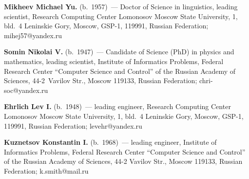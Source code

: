 \noindent
\textbf{Mikheev Michael Yu.} (b.\ 1957)~--- Doctor of Science in linguistics, leading scientist, 
Research Computing Center Lomonosov Moscow State University, 1, bld.~4 Leninskie Gory, 
Moscow, GSP-1, 119991, Russian Federation;  \mbox{mihej57@yandex.ru}

\vspace*{6pt}

\noindent
\textbf{Somin Nikolai V.} (b.\ 1947)~--- Candidate of Science (PhD) in physics and 
mathematics, leading scientist, Institute of Informatics Problems, Federal Research Center 
``Computer Science and Control'' of the Russian Academy of Sciences, 44-2~Vavilov Str., 
Moscow 119133, Russian Federation; \mbox{chri-soc@yandex.ru}

\vspace*{6pt}

\noindent
\textbf{Ehrlich Lev I.} (b.\ 1948)~--- leading engineer, Research Computing Center Lomonosov 
Moscow State University, 1, bld.~4 Leninskie Gory, Moscow, GSP-1, 119991, Russian 
Federation; \mbox{levehr@yandex.ru}

\vspace*{6pt}

\noindent
\textbf{Kuznetsov Konstantin I.} (b.\ 1968)~--- leading engineer, Institute of Informatics 
Problems, Federal Research Center ``Computer Science and Control'' of the Russian Academy 
of Sciences, 44-2 Vavilov Str., Moscow 119133, Russian Federation; \mbox{k.smith@mail.ru}
\label{end\stat}

\renewcommand{\bibname}{\protect\rm Литература} 
 

 